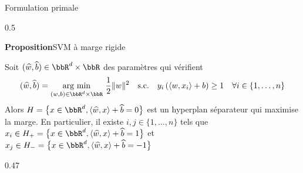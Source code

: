 \documentclass[10pt]{beamer}
\newcommand{\hsp}{\hspace*{1em}}
\begin{document}
\begin{frame}{Formulation primale}
	\vspace*{-0.6em}
	\begin{minipt}[1]{0.5}
	
	\textcolor{MPTred}{\large\textbf{Proposition}}\hfill \textcolor{MPTgrey}{SVM à marge rigide}\\
	\vspace*{-1.1em}	
	\begin{valblock}{}
		Soit $(\widehat{w}, \widehat{b}) \in \bbR^d \times \bbR$ des paramètres qui vérifient
		\begin{equation}\label{eq:optim2}
			(\widehat{w}, \widehat{b}) = \underset{(w,b) \in \bbR^d\times\bbR }{\text{{arg}}\,\min}\,\, \dfrac{1}{2} \|w\|^2 \hsp \text{s.c.} \hsp  y_i\left(\langle w,x_i \rangle +b\right) \geq 1 \hsp  \forall i \in \{1,\dots,n\} 
		\end{equation}
		Alors $H =\big\{x \in \bbR^d, \langle \widehat{w},x\rangle + \widehat{b} = 0\big\}$ est un hyperplan séparateur qui maximise la marge. En particulier, il existe $ i,j \in \{1,\dots,n\}$ tels que $x_i \in H_+ = \big\{x \in \bbR^d, \langle \widehat{w},x\rangle + \widehat{b} = 1 \big\}$ et $x_j \in H_-= \big\{x \in \bbR^d, \langle \widehat{w},x\rangle + \widehat{b} = -1 \big\}$
	\end{valblock}
\end{minipt}



\begin{minipt}[1]{0.47}
\end{minipt}
\end{frame}
\end{document}

